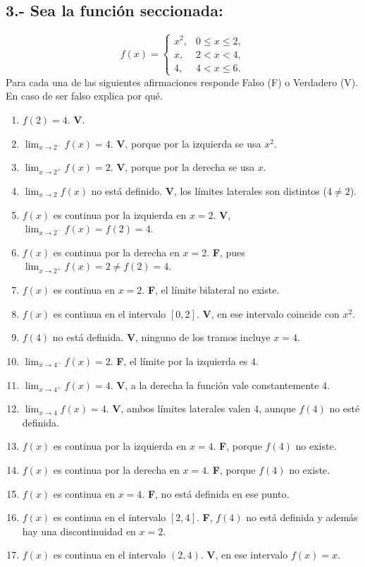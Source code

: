 \documentclass[12pt, letterpaper]{article}
\makeatletter
\renewcommand{\alph}[1]{\expandafter\@alphlatin\csname c@#1\endcsname}
\newcommand{\@alphlatin}[1]{\ifcase#1\or a\or b\or c\or d\or e\or f\or g\or h\or i\or j\or k\or l\or m\or n\or o\or p\or q\or r\or s\or t\or u\or v\or w\or x\or y\or z\else\@ctrerr\fi}
\makeatother
\begin{document}
\subsection*{3.- Sea la función seccionada:}
\[
f(x)=\begin{cases}
x^2,&0\leq x\leq2,\\
x,&2<x<4,\\
4,&4<x\leq6.
\end{cases}
\]
Para cada una de las siguientes afirmaciones responde Falso (F) o Verdadero (V). En caso de ser falso explica por qué.
\begin{enumerate}[label=\alph*)]
  \item $f(2)=4$. \textbf{V}.
  \item $\lim_{x\to2^-}f(x)=4$. \textbf{V}, porque por la izquierda se usa $x^2$.
  \item $\lim_{x\to2^+}f(x)=2$. \textbf{V}, porque por la derecha se usa $x$.
  \item $\lim_{x\to2}f(x)$ no está definido. \textbf{V}, los límites laterales son distintos ($4\neq2$).
  \item $f(x)$ es continua por la izquierda en $x=2$. \textbf{V}, $\lim_{x\to2^-}f(x)=f(2)=4$.
  \item $f(x)$ es continua por la derecha en $x=2$. \textbf{F}, pues $\lim_{x\to2^+}f(x)=2\neq f(2)=4$.
  \item $f(x)$ es continua en $x=2$. \textbf{F}, el límite bilateral no existe.
  \item $f(x)$ es continua en el intervalo $[0,2]$. \textbf{V}, en ese intervalo coincide con $x^2$.
  \item $f(4)$ no está definida. \textbf{V}, ninguno de los tramos incluye $x=4$.
  \item $\lim_{x\to4^-}f(x)=2$. \textbf{F}, el límite por la izquierda es $4$.
  \item $\lim_{x\to4^+}f(x)=4$. \textbf{V}, a la derecha la función vale constantemente $4$.
  \item $\lim_{x\to4}f(x)=4$. \textbf{V}, ambos límites laterales valen $4$, aunque $f(4)$ no esté definida.
  \item $f(x)$ es continua por la izquierda en $x=4$. \textbf{F}, porque $f(4)$ no existe.
  \item $f(x)$ es continua por la derecha en $x=4$. \textbf{F}, porque $f(4)$ no existe.
  \item $f(x)$ es continua en $x=4$. \textbf{F}, no está definida en ese punto.
  \item $f(x)$ es continua en el intervalo $[2,4]$. \textbf{F}, $f(4)$ no está definida y además hay una discontinuidad en $x=2$.
  \item $f(x)$ es continua en el intervalo $(2,4)$. \textbf{V}, en ese intervalo $f(x)=x$.
\end{enumerate}
\end{document}
